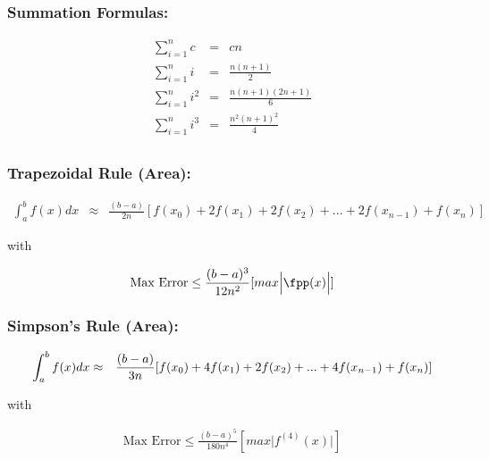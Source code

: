 \documentclass{article}[11pt]
\begin{document}
\large


\subsubsection*{\large{Summation Formulas:}}
\vspace{-0.25in}
\begin{eqnarray*}
\sum^n_{i=1}{c} &=& cn\\
\sum^n_{i=1}{i} &=& \frac{n(n+1)}{2}\\
\sum^n_{i=1}{i^2} &=& \frac{n(n+1)(2n+1)}{6}\\
\sum^n_{i=1}{i^3} &=& \frac{n^2(n+1)^2}{4}\\
\end{eqnarray*}
\vspace{0.15in}

\subsubsection*{\large{Trapezoidal Rule (Area):}}
\vspace{-0.05in}
\begin{eqnarray*}
\int_a^b{f(x)}dx & \approx & \frac{(b-a)}{2n}[f(x_0)+2f(x_1) + 2f(x_2) + ... + 2f(x_{n-1}) + f(x_n)] 
\end{eqnarray*}
\begin{center}
with 
\vspace{-0.05in}
\end{center}
\begin{eqnarray*}
\textrm{Max Error} \leq \frac{(b-a)^3}{12n^2}[ max \Big| \fpp(x) \Big| ]
\end{eqnarray*}
\vspace{0.15in}

\subsubsection*{\large{Simpson's Rule (Area):}}
\begin{eqnarray*}
\vspace{-0.05in}
\int_a^b{f(x)}dx & \approx & \frac{(b-a)}{3n}[f(x_0)+4f(x_1) + 2f(x_2) + ... + 4f(x_{n-1}) + f(x_n)] 
\end{eqnarray*}
\begin{center}
with 
\vspace{-0.05in}
\end{center}
\begin{eqnarray*}
\textrm{Max Error} \leq \frac{(b-a)^5}{180n^4}[ max \Big| f^{(4)}(x) \Big| ]
\end{eqnarray*}
\end{document}
